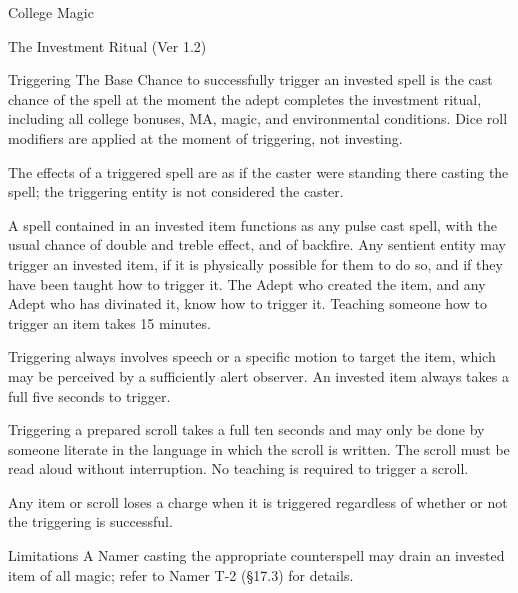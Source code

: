 \begin{Chapter}{College Magic}
\begin{ritual}{The Investment Ritual (Ver 1.2)}
\begin{effects}
\begin{Description}
\item[Triggering] The Base Chance to successfully trigger an invested
  spell is the cast chance of the spell at the moment the adept
  completes the investment ritual, including all college bonuses, MA,
  magic, and environmental conditions.  Dice roll modifiers are
  applied at the moment of triggering, not investing.


The effects of a triggered spell are as if the caster were standing
there casting the spell; the triggering entity is not considered the
caster.

A spell contained in an invested item functions as any pulse cast
spell, with the usual chance of double and treble effect, and of
backfire. Any sentient entity may trigger an invested item, if it is
physically possible for them to do so, and if they have been taught
how to trigger it.  The Adept who created the item, and any Adept who
has divinated it, know how to trigger it.  Teaching someone how to
trigger an item takes 15 minutes.

Triggering always involves speech or a specific motion to target the
item, which may be perceived by a sufficiently alert observer.  An
invested item always takes a full five seconds to trigger.

Triggering a prepared scroll takes a full ten seconds and may only be
done by someone literate in the language in which the scroll is
written.  The scroll must be read aloud without interruption.  No
teaching is required to trigger a scroll.

Any item or scroll loses a charge when it is triggered regardless of
whether or not the triggering is successful.

\item[Limitations] A Namer casting the appropriate counterspell may
  drain an invested item of all magic; refer to Namer T-2 (§17.3) for
  details.
\end{Description}
\end{effects}
\end{ritual}
\end{Chapter}
